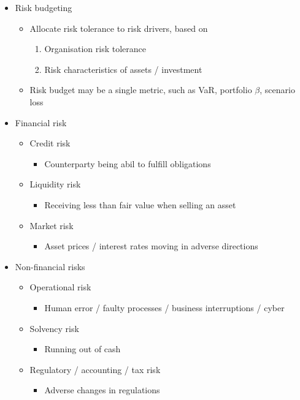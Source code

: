 \documentclass[../notes_compiled.tex]{subfiles}
\begin{document}
\begin{itemize}
\begin{itemize}
\begin{itemize}
\end{itemize}
\end{itemize}
\item Risk budgeting
\begin{itemize}
\item Allocate risk tolerance to risk drivers, based on
\begin{enumerate}
\item Organisation risk tolerance
\item Risk characteristics of assets / investment
\end{enumerate}
\item Risk budget may be a single metric, such as VaR, portfolio $\beta$, scenario loss
\end{itemize}
\item Financial risk
\begin{itemize}
\item Credit risk
\begin{itemize}
\item Counterparty being abil to fulfill obligations
\end{itemize}
\item Liquidity risk
\begin{itemize}
\item Receiving less than fair value when selling an asset
\end{itemize}
\item Market risk
\begin{itemize}
\item Asset prices / interest rates moving in adverse directions
\end{itemize}
\end{itemize}
\item Non-financial risks
\begin{multicols}{2}
\begin{itemize}
\item Operational risk
\begin{itemize}
\item Human error / faulty processes / business interruptions / cyber
\end{itemize}
\item Solvency risk
\begin{itemize}
\item Running out of cash
\end{itemize}
\item Regulatory / accounting / tax risk
\begin{itemize}
\item Adverse changes in regulations

\end{itemize}
\end{itemize}
\end{multicols}
\end{itemize}
\end{document}

